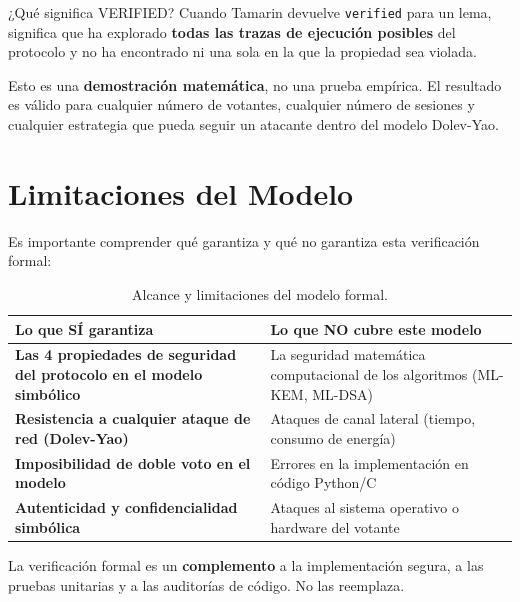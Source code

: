 \documentclass[12pt, a4paper]{article}
\begin{document}
\medskip

\begin{cajaConceto}{¿Qué significa VERIFIED?}
Cuando Tamarin devuelve \texttt{verified} para un lema, significa que ha
explorado \textbf{todas las trazas de ejecución posibles} del protocolo y
no ha encontrado ni una sola en la que la propiedad sea violada.

Esto es una \textbf{demostración matemática}, no una prueba empírica. El
resultado es válido para cualquier número de votantes, cualquier número de
sesiones y cualquier estrategia que pueda seguir un atacante dentro del
modelo Dolev-Yao.
\end{cajaConceto}

\section{Limitaciones del Modelo}

Es importante comprender qué garantiza y qué no garantiza esta verificación
formal:

\medskip

\begin{table}[h!]
\centering
\begin{tabular}{>{\bfseries}p{6cm} p{7.5cm}}
\toprule
Lo que SÍ garantiza & Lo que NO cubre este modelo \\
\midrule
Las 4 propiedades de seguridad del protocolo en el modelo simbólico
& La seguridad matemática computacional de los algoritmos (ML-KEM, ML-DSA) \\[4pt]
Resistencia a cualquier ataque de red (Dolev-Yao)
& Ataques de canal lateral (tiempo, consumo de energía) \\[4pt]
Imposibilidad de doble voto en el modelo
& Errores en la implementación en código Python/C \\[4pt]
Autenticidad y confidencialidad simbólica
& Ataques al sistema operativo o hardware del votante \\
\bottomrule
\end{tabular}
\caption{Alcance y limitaciones del modelo formal.}
\end{table}

\medskip

\noindent La verificación formal es un \textbf{complemento} a la implementación
segura, a las pruebas unitarias y a las auditorías de código. No las reemplaza.
\end{document}
